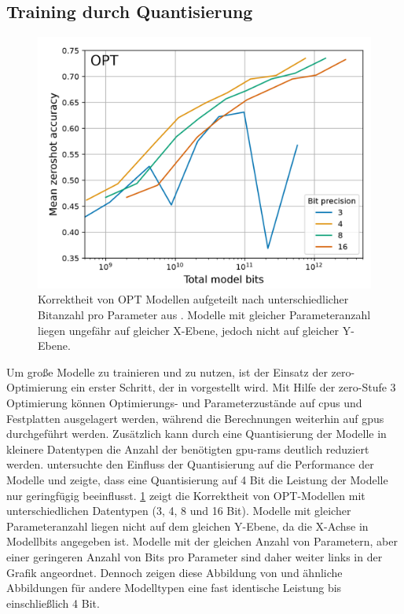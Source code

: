\subsection{Training durch Quantisierung}
\begin{figure}
    \centering
    \includegraphics[width=\textwidth]{results/bit_scaling_laws.png}
    \caption[Korrektheit von OPT Modellen nach Modellbits]{Korrektheit von OPT Modellen aufgeteilt nach unterschiedlicher Bitanzahl pro Parameter aus \citet{4bit}. Modelle mit gleicher Parameteranzahl liegen ungefähr auf gleicher X-Ebene, jedoch nicht auf gleicher Y-Ebene.}%
    \label{fig:bit_scaling}
\end{figure}
Um große Modelle zu trainieren und zu nutzen, ist der Einsatz der \ac{zero}-Optimierung ein erster Schritt, der in \citet{deepspeed} vorgestellt wird.
Mit Hilfe der \ac{zero}-Stufe 3 Optimierung können Optimierungs- und Parameterzustände auf \ac{cpu}s und Festplatten ausgelagert werden, während die Berechnungen weiterhin auf \ac{gpu}s durchgeführt werden.
Zusätzlich kann durch eine Quantisierung der Modelle in kleinere Datentypen die Anzahl der benötigten \ac{gpu}-\ac{ram}s deutlich reduziert werden.
\citet{4bit} untersuchte den Einfluss der Quantisierung auf die Performance der Modelle und zeigte, dass eine Quantisierung auf 4 Bit die Leistung der Modelle nur geringfügig beeinflusst.
\cref{fig:bit_scaling} zeigt die Korrektheit von OPT-Modellen mit unterschiedlichen Datentypen (3, 4, 8 und 16 Bit).
Modelle mit gleicher Parameteranzahl liegen nicht auf dem gleichen Y-Ebene, da die X-Achse in Modellbits angegeben ist.
Modelle mit der gleichen Anzahl von Parametern, aber einer geringeren Anzahl von Bits pro Parameter sind daher weiter links in der Grafik angeordnet.
Dennoch zeigen diese Abbildung von \citet{4bit} und ähnliche Abbildungen für andere Modelltypen eine fast identische Leistung bis einschließlich 4 Bit.\\

